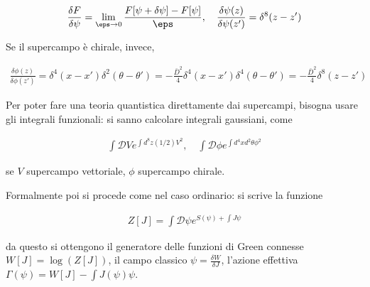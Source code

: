 \documentclass{report}
\begin{document}
\begin{align}
    \frac{\delta F}{\delta \psi} = \lim_{\eps \to 0}\frac{F[\psi + \delta \psi] -F[\psi]}{\eps}, \quad \frac{\delta \psi(z)}{\delta \psi(z')} = \delta^8(z-z')
\end{align}

Se il supercampo è chirale, invece, 

\begin{align}
    \frac{\delta \phi(z)}{\delta \phi(z')}  = \delta^4(x-x')\delta^2(\theta-\theta') = -\frac{\bar{D}^2}{4}\delta^4(x-x')\delta^4(\theta -\theta') = -\frac{\bar{D}^2}{4}\delta^8(z-z')
\end{align}

Per poter fare una teoria quantistica direttamente dai supercampi, bisogna usare gli integrali funzionali: si sanno calcolare integrali gaussiani, come 

\begin{align}
    \int \mathcal{D}V e^{\int d^8z (1/2)V^2}, \quad \int \mathcal{D}\phi e^{\int d^4x d^2\theta \phi^2}
\end{align}

se \(V\) supercampo vettoriale, \(\phi\) supercampo chirale. 

Formalmente poi si procede come nel caso ordinario: si scrive la funzione 

\begin{align}
    Z[J] = \int \mathcal{D}\psi e^{S(\psi) + \int J\psi}
\end{align}

da questo si ottengono il generatore delle funzioni di Green connesse \(W[J] = \log(Z[J])\), il campo classico \(\psi = \frac{\delta W}{\delta J}\), l'azione effettiva \(\Gamma(\psi) = W[J] - \int J(\psi)\psi\). 
\end{document}
